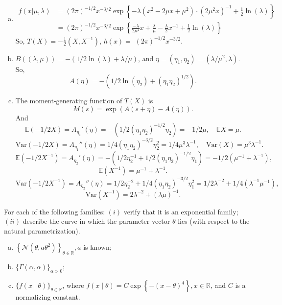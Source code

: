 \begin{solution}
    \begin{enumerate}[(a)]
        \item \[
            \begin{aligned}
                f(x|\mu,\lambda)&=(2 \pi)^{-1 / 2} x^{-3 / 2}\exp\left\{-\lambda(x^2-2\mu x+\mu^2)\cdot(2\mu^2x)^{-1}+\frac{1}{2}\ln(\lambda)\right\}\\
                &=(2 \pi)^{-1 / 2} x^{-3 / 2}\exp\left\{\frac{-\lambda}{2\mu^2}x + \frac{\lambda}{\mu}-\frac{\lambda}{2}x^{-1}+\frac{1}{2}\ln(\lambda)\right\}
            \end{aligned}
        \]
        So, $T(X)=-\frac{1}{2}(X,X^{-1})$, \(h(x)=\) \((2 \pi)^{-1 / 2} x^{-3 / 2}\). 
        \item $B((\lambda, \mu))=-(1/2\ln(\lambda)+\lambda/\mu)$, and $\eta=(\eta_1,\eta_2)=(\lambda/\mu^2, \lambda)$. So, 
        \[
            A(\eta)=-(1/2\ln(\eta_2)+(\eta_1\eta_2)^{1/2}). 
        \]
        \item The moment-generating function of $T(X)$ is
        \[
            M(s)=\exp\left(A(s+\eta)-A(\eta)\right). 
        \]
        And
        \[
            \mathbb{E}(-1/2X)=A_{\eta_1}'(\eta)=-(1/2(\eta_1\eta_2)^{-1/2}\eta_2)=-1/2\mu,\quad \mathbb{E}X=\mu. 
        \]
        \[
            \text{Var}(-1/2X)=A_{\eta_1}''(\eta)=1/4(\eta_1\eta_2)^{-3/2}\eta_2^2=1/4\mu^3\lambda^{-1},\quad \text{Var}(X)=\mu^3\lambda^{-1}. 
        \]
        \[
            \mathbb{E}(-1/2X^{-1})=A_{\eta_2}'(\eta)=-(1/2\eta_2^{-1}+1/2(\eta_1\eta_2)^{-1/2}\eta_1)=-1/2(\mu^{-1}+\lambda^{-1}), 
        \]
        \[
            \mathbb{E}(X^{-1})=\mu^{-1}+\lambda^{-1}. 
        \]
        \[
            \text{Var}(-1/2X^{-1})=A_{\eta_2}''(\eta)=1/2\eta_2^{-2}+1/4(\eta_1\eta_2)^{-3/2}\eta_1^2=1/2\lambda^{-2}+1/4(\lambda^{-1}\mu^{-1}),
        \]
        \[
            \text{Var}(X^{-1})=2\lambda^{-2}+(\lambda\mu)^{-1}. 
        \]
    \end{enumerate}
\end{solution}

\begin{exercise}
    For each of the following families: \((i)\) verify that it is an exponential family; \((i i)\) describe the curve in which the parameter vector \(\theta\) lies (with respect to the natural parametrization). 
    \begin{enumerate}[(a)]
        \item \(\left\{\mathcal{N}\left(\theta, a \theta^{2}\right)\right\}_{\theta \in \mathbb{R}}, a\) is known;
        \item \(\{\Gamma(\alpha, \alpha)\}_{\alpha>0} ;\)
        \item \(\{f(x \mid \theta)\}_{\theta \in \mathbb{R}}\), where \(f(x \mid \theta)=C \exp \left\{-(x-\theta)^{4}\right\}, x \in \mathbb{R}\), and \(C\) is a normalizing constant.
    \end{enumerate}
\end{exercise}

